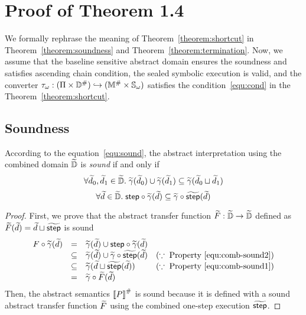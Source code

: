 \section{Proof of Theorem 1.4}\label{sec:proof}

We formally rephrase the meaning of Theorem~\ref{theorem:shortcut} in
Theorem~\ref{theorem:soundness} and Theorem~\ref{theorem:termination}.  Now, we
assume that the baseline sensitive abstract domain ensures the soundness and
satisfies ascending chain condition, the sealed symbolic execution is valid,
and the converter ${\tau}_\omega: (\Pi \times {\mathbb{D}}^{\#}) \hookrightarrow
({\mathbb{M}}^{\#} \times {\mathbb{S}}_\omega)$ satisfies the
condition~\ref{equ:cond} in the Theorem~\ref{theorem:shortcut}.


\subsection{Soundness}

\begin{theorem}[Soundness]\label{theorem:soundness}
  According to the equation~\ref{equ:sound}, the abstract interpretation using
  the combined domain $\widetilde{\mathbb{D}}$ is \textit{sound} if and only if
  \begin{equation}\label{equ:comb-sound1}
    \forall \widetilde{d}_0, \widetilde{d}_1 \in \widetilde{\mathbb{D}}. \; \widetilde{\gamma}(\widetilde{d}_0) \cup
    \widetilde{\gamma}(\widetilde{d}_1) \subseteq \widetilde{\gamma}(\widetilde{d}_0 \sqcup \widetilde{d}_1)
  \end{equation}
  \begin{equation}\label{equ:comb-sound2}
    \forall \widetilde{d} \in \widetilde{\mathbb{D}}. \; \textsf{step} \circ \widetilde{\gamma}(\widetilde{d}) \subseteq
    \widetilde{\gamma} \circ \widetilde{\textsf{step}}(\widetilde{d})\\
  \end{equation}
\end{theorem}
\begin{proof}
  First, we prove that the abstract transfer function $\widetilde{F}: \widetilde{\mathbb{D}}
  \rightarrow \widetilde{\mathbb{D}}$ defined as $\widetilde{F}(\widetilde{d}) = \widetilde{d} \sqcup
  \widetilde{\textsf{step}}$ is sound
  \[
    \begin{array}{rcll}
      F \circ \widetilde{\gamma}(\widetilde{d})
      &=& \widetilde{\gamma}(\widetilde{d}) \cup \textsf{step} \circ \widetilde{\gamma}(\widetilde{d})\\
      &\subseteq& \widetilde{\gamma}(\widetilde{d}) \cup \widetilde{\gamma} \circ \widetilde{\textsf{step}}(\widetilde{d})
      & (\because \; \text{Property~\ref{equ:comb-sound2}})\\
      &\subseteq& \widetilde{\gamma}(\widetilde{d} \sqcup \widetilde{\textsf{step}}(\widetilde{d}))
      & (\because \; \text{Property~\ref{equ:comb-sound1}})\\
      &=& \widetilde{\gamma} \circ \widetilde{F}(\widetilde{d})\\
    \end{array}
  \]
  Then, the abstract semantics ${\llbracket P \rrbracket}^{\#}$ is sound because it is defined
  with a sound abstract transfer function $\widetilde{F}$ using the combined
  one-step execution $\widetilde{\textsf{step}}$.
\end{proof}

